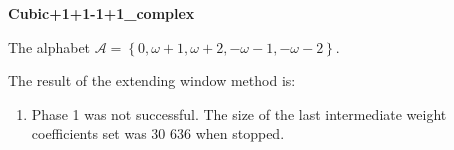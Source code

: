 \begin{exmp}
\textbf{ Cubic+1+1-1+1\_complex }

\label{ex:Cubic+1+1-1+1complex}

The alphabet $\mathcal{A} =\left\{0, \omega + 1, \omega + 2, -\omega - 1, -\omega - 2\right\}$.

The result of the extending window method is:
\begin{enumerate}
    \item Phase 1 was not successful. The size of the last intermediate weight coefficients set was 30 636 when stopped. 

\end{enumerate}
\end{exmp}
